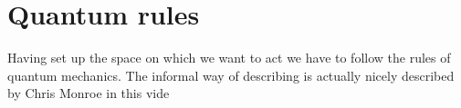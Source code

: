 \section{Quantum rules}
Having set up the space on which we want to act we have to follow the rules of quantum mechanics. The informal way of describing is actually nicely described by Chris Monroe in this vide